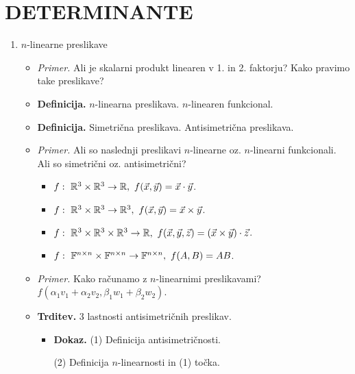 \section{DETERMINANTE}
\begin{enumerate}
    \item $n$-linearne preslikave
    \begin{itemize}
        \item \colorbox{yellow!30}{\emph{Primer.}} Ali je skalarni produkt linearen v 1. in 2. faktorju? Kako pravimo take preslikave?
        \item \colorbox{purple!30}{\textbf{Definicija.}} $n$-linearna preslikava. $n$-linearen funkcional.
        \item \colorbox{purple!30}{\textbf{Definicija.}} Simetrična preslikava. Antisimetrična preslikava.
        \item \colorbox{yellow!30}{\emph{Primer.}} Ali so naslednji preslikavi $n$-linearne oz. $n$-linearni funkcionali. Ali so simetrični oz. antisimetrični?
        \begin{itemize}
            \item $f: \ \RR^3 \times \RR^3 \to \RR, \ f(\vec{x}, \vec{y}) = \vec{x} \cdot \vec{y}$.
            \item $f: \ \RR^3 \times \RR^3 \to \RR^3, \ f(\vec{x}, \vec{y}) = \vec{x} \times \vec{y}$.
            \item $f: \ \mathbb{R}^3 \times \mathbb{R}^3 \times \mathbb{R}^3 \to \mathbb{R}, \ f(\vec{x}, \vec{y}, \vec{z}) = (\vec{x} \times \vec{y}) \cdot \vec{z}$.
            \item $f: \ \mathbb{F}^{n \times n} \times \mathbb{F}^{n \times n} \to \mathbb{F}^{n \times n}, \ f(A,B) = AB$.
        \end{itemize}
        \item \colorbox{yellow!30}{\emph{Primer.}} Kako računamo z $n$-linearnimi preslikavami? $f(\alpha_1 v_1 + \alpha_2 v_2, \beta_1 w_1 + \beta_2 w_2)$.
        \item \colorbox{blue!30}{\textbf{Trditev.}} 3 lastnosti antisimetričnih preslikav.
        \begin{itemize}
            \item \colorbox{green!30}{\textbf{Dokaz.}} (1) Definicija antisimetričnosti.
            
            (2) Definicija $n$-linearnosti in (1) točka.


\end{itemize}
\end{itemize}
\end{enumerate}
